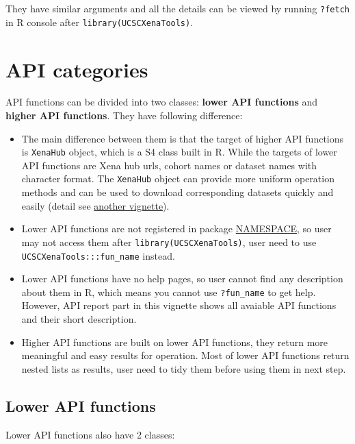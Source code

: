\documentclass[nofonts,]{tufte-handout}
\providecommand{\tightlist}{%
  \setlength{\itemsep}{0pt}\setlength{\parskip}{0pt}}
\begin{document}
They have similar arguments and all the details can be viewed by running
\texttt{?fetch} in R console after \texttt{library(UCSCXenaTools)}.

\hypertarget{api-categories}{%
\section{API categories}\label{api-categories}}

API functions can be divided into two classes: \textbf{lower API
functions} and \textbf{higher API functions}. They have following
difference:

\begin{itemize}
\tightlist
\item
  The main difference between them is that the target of higher API
  functions is \texttt{XenaHub} object, which is a S4 class built in R.
  While the targets of lower API functions are Xena hub urls, cohort
  names or dataset names with character format. The \texttt{XenaHub}
  object can provide more uniform operation methods and can be used to
  download corresponding datasets quickly and easily (detail see
  \href{https://shixiangwang.github.io/home/en/tools/ucscxenatools-intro/}{another
  vignette}).
\item
  Lower API functions are not registered in package
  \href{https://github.com/ShixiangWang/UCSCXenaTools/blob/master/NAMESPACE}{NAMESPACE},
  so user may not access them after \texttt{library(UCSCXenaTools)},
  user need to use \texttt{UCSCXenaTools:::fun\_name} instead.
\item
  Lower API functions have no help pages, so user cannot find any
  description about them in R, which means you cannot use
  \texttt{?fun\_name} to get help. However, API report part in this
  vignette shows all avaiable API functions and their short description.
\item
  Higher API functions are built on lower API functions, they return
  more meaningful and easy results for operation. Most of lower API
  functions return nested lists as results, user need to tidy them
  before using them in next step.
\end{itemize}

\hypertarget{lower-api-functions}{%
\subsection{Lower API functions}\label{lower-api-functions}}

Lower API functions also have 2 classes:
\end{document}
